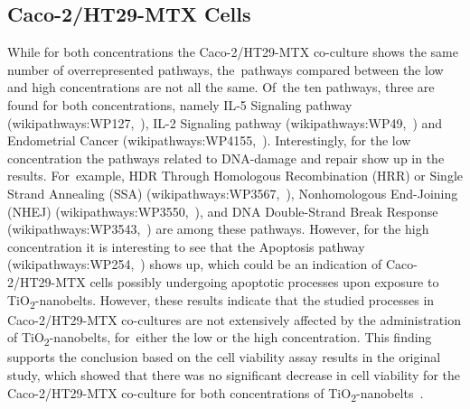 \documentclass[ijms,article,accept,moreauthors,pdftex]{Definitions/mdpi}
\begin{document}
\begin{paracol}{2}
\subsection{{Caco-2/HT29-MTX} Cells}
While for both concentrations the {Caco-2/HT29-MTX co-culture} shows the same number of overrepresented pathways, the~pathways compared between the low and high concentrations are not all the same. Of~the ten pathways, three are found for both concentrations, namely IL-5 Signaling pathway (wikipathways:WP127,~\cite{WP127}), IL-2 Signaling pathway (wikipathways:WP49,~\cite{WP49}) and Endometrial Cancer (wikipathways:WP4155,~\cite{WP4155}). 
Interestingly, for the low concentration the pathways related to DNA-damage and repair show up in the results. %
For~example, HDR Through Homologous Recombination (HRR) or Single Strand Annealing (SSA) (wikipathways:WP3567,~\cite{WP3567}), Nonhomologous End-Joining (NHEJ) (wikipathways:WP3550,~\cite{WP3550}), and DNA Double-Strand Break Response (wikipathways:WP3543,~\cite{WP3543}) are among these pathways. However, for the high concentration it is interesting to see that the Apoptosis pathway (wikipathways:WP254,~\cite{WP254}) shows up, which could be an indication of {Caco-2/HT29-MTX} cells possibly undergoing apoptotic processes upon exposure to TiO\textsubscript{2}-nanobelts. However, these results indicate that the studied processes in {Caco-2/HT29-MTX co-cultures} are not extensively affected by the administration of TiO\textsubscript{2}-nanobelts, for~either the low or the high concentration. This finding supports the conclusion based on the cell viability assay results in the original study, which showed that there was no significant decrease in cell viability for the {Caco-2/HT29-MTX co-culture} for both concentrations of TiO\textsubscript{2}-nanobelts~\cite{Tilton2013}. 


\end{paracol}
\end{document}
